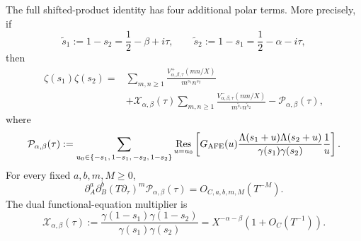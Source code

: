 \begin{lemma}
The full shifted-product identity has four additional polar terms.  More
precisely, if
\[
\widetilde s_1:=1-s_2=\frac12-\beta+i\tau,
\qquad
\widetilde s_2:=1-s_1=\frac12-\alpha-i\tau,
\]
then
\begin{equation}
\boxed{
\begin{aligned}
\zeta(s_1)\zeta(s_2)={}&
\sum_{m,n\ge1}\frac{
 V^+_{\alpha,\beta,\tau}(mn/X)}{m^{s_1}n^{s_2}}\\
&+\mathcal X_{\alpha,\beta}(\tau)
\sum_{m,n\ge1}\frac{
 V^-_{\alpha,\beta,\tau}(mn/X)}
 {m^{\widetilde s_1}n^{\widetilde s_2}}
-\mathcal P_{\alpha,\beta}(\tau),
\end{aligned}}
\label{eq:exact-shifted-product-AFE}
\end{equation}
where
\begin{equation}
\mathcal P_{\alpha,\beta}(\tau)
:=\sum_{u_0\in\{-s_1,\,1-s_1,\,-s_2,\,1-s_2\}}
\operatorname*{Res}_{u=u_0}
\left[
 G_{\rm AFE}(u)
 \frac{\Lambda(s_1+u)\Lambda(s_2+u)}
 {\gamma(s_1)\gamma(s_2)}\frac1u
\right].
\label{eq:AFE-four-polar-residues}
\end{equation}
For every fixed $a,b,m,M\ge0$,
\begin{equation}
\boxed{
\partial_A^a\partial_B^b(T\partial_\tau)^m
\mathcal P_{\alpha,\beta}(\tau)=O_{C,a,b,m,M}(T^{-M}).}
\label{eq:AFE-polar-Gaussian-bound}
\end{equation}
The dual functional-equation multiplier is
\begin{equation}
\mathcal X_{\alpha,\beta}(\tau)
:=\frac{\gamma(1-s_1)\gamma(1-s_2)}
{\gamma(s_1)\gamma(s_2)}
=X^{-\alpha-\beta}\left(1+O_C(T^{-1})\right).
\label{eq:AFE-dual-factor}
\end{equation}


\end{lemma}

